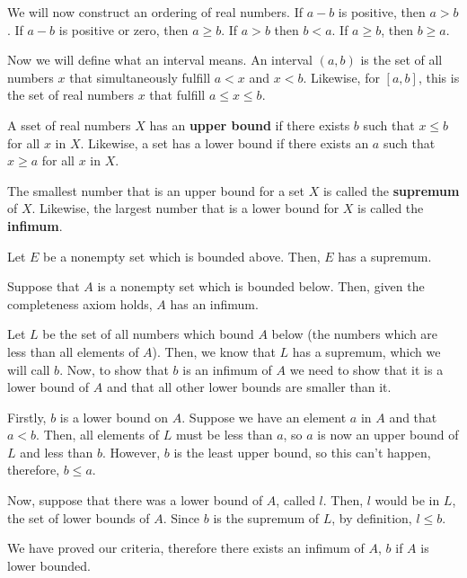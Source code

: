 \documentclass{article}
\begin{document}
We will now construct an ordering of real numbers. If $a-b$ is positive, then $a > b$. If $a-b$ is positive or zero, then $a\geq b$. If $a>b$ then $b<a$. If $a\geq b$, then $b\geq a$.

Now we will define what an interval means. An interval $(a,b)$ is the set of all numbers $x$ that simultaneously fulfill $a < x$ and $x < b$. Likewise, for $[a,b]$, this is the set of real numbers $x$ that fulfill $a \leq x \leq b$.

\begin{definition}[Boundedness]
A sset of real numbers $X$ has an \textbf{upper bound} if there exists $b$ such that $x \leq b$ for all $x$ in $X$. Likewise, a set has a lower bound if there exists an $a$ such that $x \geq a$ for all $x$ in $X$.

The smallest number that is an upper bound for a set $X$ is called the \textbf{supremum} of $X$. Likewise, the largest number that is a lower bound for $X$ is called the \textbf{infimum}.
\end{definition}

\begin{definition}
Let $E$ be a nonempty set which is bounded above. Then, $E$ has a supremum.
\end{definition}

\begin{theorem}
Suppose that $A$ is a nonempty set which is bounded below. Then, given the completeness axiom holds, $A$ has an infimum.
\end{theorem}

\begin{customproof}
Let $L$ be the set of all numbers which bound $A$ below (the numbers which are less than all elements of $A$). Then, we know that $L$ has a supremum, which we will call $b$. Now, to show that $b$ is an infimum of $A$ we need to show that it is a lower bound of $A$ and that all other lower bounds are smaller than it. 

Firstly, $b$ is a lower bound on $A$. Suppose we have an element $a$ in $A$ and that $a < b$. Then, all elements of $L$ must be less than $a$, so $a$ is now an upper bound of $L$ and less than $b$. However, $b$ is the least upper bound, so this can't happen, therefore, $b \leq a$. 

Now, suppose that there was a lower bound of $A$, called $l$. Then, $l$ would be in $L$, the set of lower bounds of $A$. Since $b$ is the supremum of $L$, by definition, $l \leq b$. 

We have proved our criteria, therefore there exists an infimum of $A$, $b$ if $A$ is lower bounded. 
\end{customproof}
\end{document}
